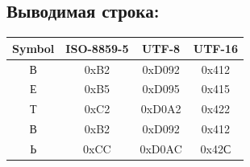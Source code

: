 \subsection{Выводимая строка:}
\begin{center}
    \begin{tabular}{|c|c|c|c|}
        \hline
        \textbf{Symbol} & \textbf{ISO-8859-5} & \textbf{UTF-8} & \textbf{UTF-16} \\
        \hline
        В               & 0xB2                & 0xD092         & 0x412           \\
        Е               & 0xB5                & 0xD095         & 0x415           \\
        Т               & 0xC2                & 0xD0A2         & 0x422           \\
        В               & 0xB2                & 0xD092         & 0x412           \\
        Ь               & 0xCC                & 0xD0AC         & 0x42С           \\
        \hline
    \end{tabular}
\end{center}

